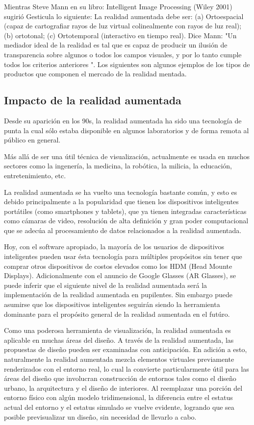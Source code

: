 Mientras Steve Mann en su libro: Intelligent Image Processing (Wiley 2001) sugirió Gesticula lo siguiente: La realidad aumentada debe ser: (a) Ortoespacial (capaz de cartografiar rayos de luz virtual colinealmente con rayos de luz real); (b) ortotonal; (c) Ortotemporal (interactivo en tiempo real). Dice Mann: "Un mediador ideal de la realidad es tal que es capaz de producir un ilusión de transparencia sobre algunos o todos los campos visuales, y por lo tanto cumple todos los criterios anteriores ". Los siguientes son algunos ejemplos de los tipos de productos que componen el mercado de la realidad mentada.\cite{BXX} \par
\subsection{Impacto de la realidad aumentada}
Desde su aparición en los 90s, la realidad aumentada ha sido una tecnología de punta la cual sólo estaba disponible en algunos laboratorios y de forma remota al público en general. \par
Más allá de ser una útil técnica de visualización, actualmente es usada en muchos sectores como la ingenería, la medicina, la robótica, la milicia, la educación, entretenimiento, etc.\par
La realidad aumentada se ha vuelto una tecnología bastante común, y esto es debido principalmente a la popularidad que tienen los dispositivos inteligentes portátiles (como smartphones y tablets), que ya tienen integradas características como cámaras de video, resolución de alta definición y gran poder computacional que se adecúa al procesamiento de datos relacionados a la realidad aumentada.\par
Hoy, con el software apropiado, la mayoría de los usuarios de dispositivos inteligentes pueden usar ésta tecnología para múltiples propósitos sin tener que comprar otros dispositivos de costos elevados como los HDM (Head Mounte Displays). Adicionalmente con el anuncio de Google Glasses (AR Glasses), se puede inferir que el siguiente nivel de la realidad aumentada será la implementación de la realidad aumentada en pupilentes. Sin embargo puede asumirse que los dispositivos inteligentes seguirán siendo la herramienta dominante para el propósito general de la realidad aumentada en el futúro.\par
Como una poderosa herramienta de visualización, la realidad aumentada es aplicable en muchas áreas del diseño. A través de la realidad aumentada, las propuestas de diseño pueden ser examinadas con anticipación. En adición a esto, naturalmente la realidad aumentada mezcla elementos virtuales previamente renderizados con el entorno real, lo cual la convierte particularmente útil para las áreas del diseño que involucran construcción de entornos tales como el diseño urbano, la arquitectura y el diseño de interiores. Al reemplazar una porción del entorno físico con algún modelo tridimensional, la diferencia entre el estatus actual del entorno y el estatus simulado se vuelve evidente, logrando que sea posible previsualizar un diseño, sin necesidad de llevarlo a cabo.\par
